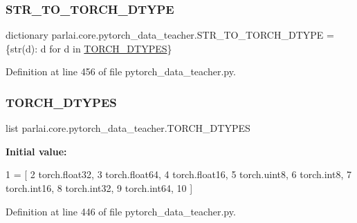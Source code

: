 \subsubsection{\texorpdfstring{S\+T\+R\+\_\+\+T\+O\+\_\+\+T\+O\+R\+C\+H\+\_\+\+D\+T\+Y\+PE}{STR\_TO\_TORCH\_DTYPE}}
{\footnotesize\ttfamily dictionary parlai.\+core.\+pytorch\+\_\+data\+\_\+teacher.\+S\+T\+R\+\_\+\+T\+O\+\_\+\+T\+O\+R\+C\+H\+\_\+\+D\+T\+Y\+PE = \{str(d)\+: d for d in \hyperlink{namespaceparlai_1_1core_1_1pytorch__data__teacher_a70d3594b63522c1d2596bd15f1fb89e0}{T\+O\+R\+C\+H\+\_\+\+D\+T\+Y\+P\+ES}\}}



Definition at line 456 of file pytorch\+\_\+data\+\_\+teacher.\+py.

\mbox{\label{namespaceparlai_1_1core_1_1pytorch__data__teacher_a70d3594b63522c1d2596bd15f1fb89e0}} 
\subsubsection{\texorpdfstring{T\+O\+R\+C\+H\+\_\+\+D\+T\+Y\+P\+ES}{TORCH\_DTYPES}}
{\footnotesize\ttfamily list parlai.\+core.\+pytorch\+\_\+data\+\_\+teacher.\+T\+O\+R\+C\+H\+\_\+\+D\+T\+Y\+P\+ES}

{\bfseries Initial value\+:}
\begin{DoxyCode}
1 =  [
2     torch.float32,
3     torch.float64,
4     torch.float16,
5     torch.uint8,
6     torch.int8,
7     torch.int16,
8     torch.int32,
9     torch.int64,
10 ]
\end{DoxyCode}


Definition at line 446 of file pytorch\+\_\+data\+\_\+teacher.\+py.

